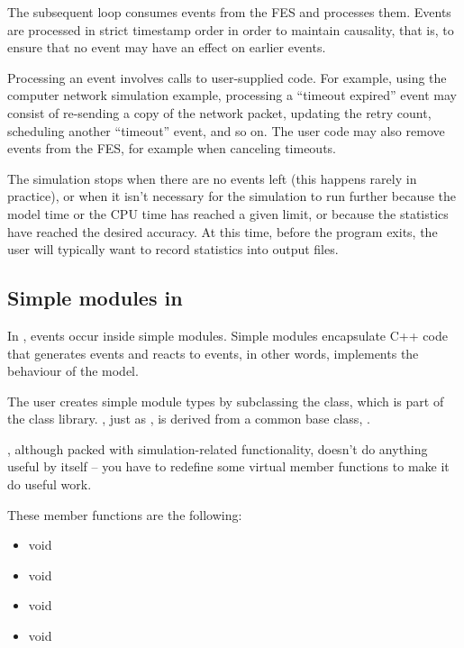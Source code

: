 The subsequent loop consumes events from the FES and processes
them. Events are processed in strict timestamp order in order
to maintain causality, that is, to ensure that no event may have
an effect on earlier events.

Processing an event involves calls to user-supplied code. For example,
using the computer network simulation example, processing a ``timeout
expired'' event may consist of re-sending a copy of the network
packet, updating the retry count, scheduling another ``timeout''
event, and so on. The user code may also remove events from the FES,
for example when canceling timeouts.

The simulation stops when there are no events left (this happens
rarely in practice), or when it isn't necessary for the simulation
to run further because the model time or the CPU time has reached
a given limit, or because the statistics have reached the desired
accuracy. At this time, before the program exits, the user
will typically want to record statistics into output files.



\subsection{Simple modules in {\opp}}
\label{sec:simple-modules-in-opp}

In {\opp}, events occur inside simple modules.
Simple modules encapsulate C++ code that generates events and reacts to events,
in other words, implements the behaviour of the model.

The user creates simple module types by subclassing the 
class, which is part of the {\opp} class library.
, just as , is derived
from a common base class, .

, although packed with simulation-related
functionality, doesn't do anything useful by itself -- you have
to redefine some virtual member functions to make it do useful work.


These member functions are the following:
\begin{itemize}
  \item{void }
  \item{void }
  \item{void }
  \item{void }
\end{itemize}

